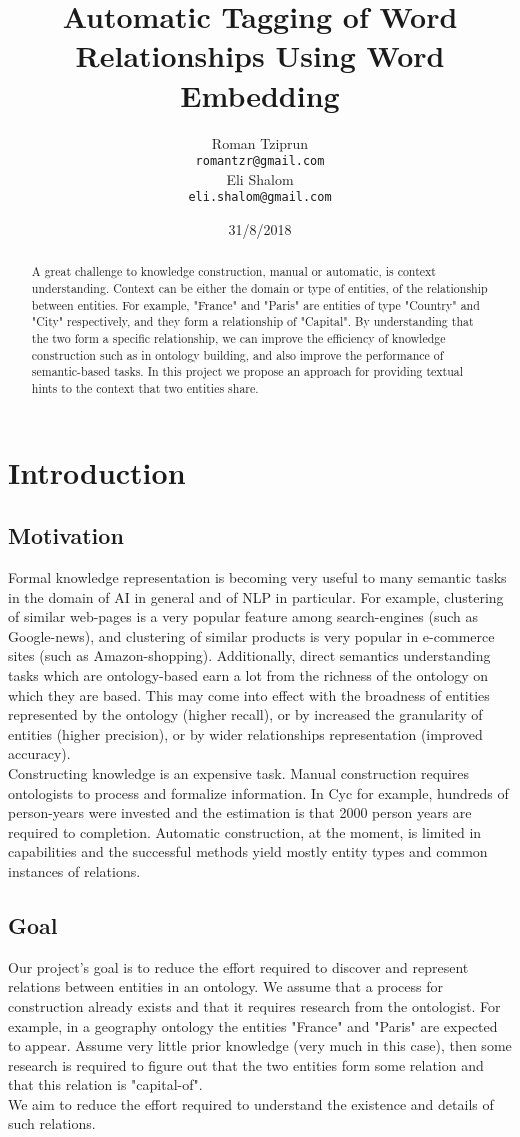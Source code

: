 \documentclass[11pt,a4paper]{article}
\title{Automatic Tagging of Word Relationships Using Word Embedding}
\author{Roman Tziprun \\
  {\tt romantzr@gmail.com} \\\And
  Eli Shalom \\
  {\tt eli.shalom@gmail.com} \\}
\date{31/8/2018}
\begin{document}
\maketitle
\begin{abstract}
  A great challenge to knowledge construction, manual or automatic, is context understanding. Context can be either the domain or type of entities, of the relationship between entities. For example, "France" and "Paris" are entities of type "Country" and "City" respectively,  and they form a relationship of "Capital". By understanding that the two form a specific relationship, we can improve the efficiency of knowledge construction such as in ontology building, and also improve the performance of semantic-based tasks. In this project we propose an approach for providing textual hints to the context that two entities share.
\end{abstract}
\section{Introduction}
\subsection{Motivation}
Formal knowledge representation is becoming very useful to many semantic tasks in the domain of AI in general and of NLP in particular. For example, clustering of similar web-pages is a very popular feature among search-engines (such as Google-news), and clustering of similar products is very popular in e-commerce sites (such as Amazon-shopping). Additionally, direct semantics understanding tasks which are ontology-based earn a lot from the richness of the ontology on which they are based. This may come into effect with the broadness of entities represented by the ontology (higher recall), or by increased the granularity of entities (higher precision), or by wider relationships representation (improved accuracy).\\
Constructing knowledge is an expensive task. Manual construction requires ontologists to process and formalize information. In Cyc for example, hundreds of person-years were invested and the estimation is that 2000 person years are required to completion. Automatic construction, at the moment, is limited in capabilities and  the successful methods yield mostly entity types and common instances of relations.
\subsection{Goal}
Our project's goal is to reduce the effort required to discover and represent relations between entities in an ontology. We assume that a process for construction already exists and that it requires research from the ontologist. For example, in a geography ontology the entities "France" and "Paris" are expected to appear. Assume very little prior knowledge (very much in this case), then some research is required to figure out that the two entities form some relation and that this relation is "capital-of".\\
We aim to reduce the effort required to understand the existence and details of such relations.
\end{document}
